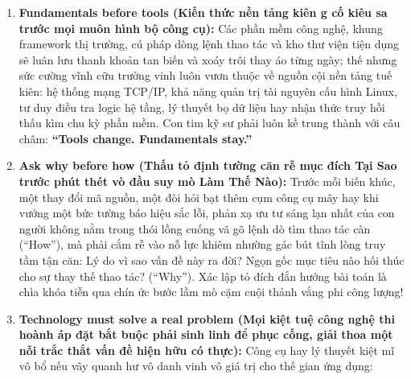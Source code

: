 \begin{enumerate}
\def\labelenumi{\arabic{enumi}.}
\tightlist
\item
  \textbf{Fundamentals before tools (Kiến thức nền tảng kiên g cố kiêu
  sa trước mọi muôn hình bộ công cụ):} Các phần mềm công nghệ, khung
  framework thị trường, cú pháp dòng lệnh thao tác và kho thư viện tiện
  dụng sẽ luân lưu thanh khoản tan biến và xoáy trôi thay áo từng ngày;
  thế nhưng sức cường vĩnh cữu trường vinh luôn vươn thuộc về nguồn cội
  nền tảng tuế kiên: hệ thống mạng TCP/IP, khả năng quản trị tài nguyên
  cấu hình Linux, tư duy điều tra logic hệ tầng, lý thuyết bọ dữ liệu
  hay nhận thức truy hồi thấu kìm chu kỳ phần mềm. Con tim kỹ sư phải
  luôn kề trung thành với câu châm: \textbf{``Tools change. Fundamentals
  stay.''}
\item
  \textbf{Ask why before how (Thấu tỏ định tường căn rễ mục đích Tại Sao
  trước phút thét vò đầu suy mò Làm Thế Nào):} Trước mỗi biến khúc, một
  thay đổi mã nguồn, một đòi hỏi bạt thêm cụm công cụ mây hay khi vướng
  một bức tường báo hiệu sắc lỗi, phản xạ ưu tư sáng lạn nhất của con
  người không nằm trong thói lồng cuống vã gõ lệnh dò tìm thao tác càn
  (``How''), mà phải cắm rễ vào nỗ lực khiêm nhường gác bút tĩnh lòng
  truy tầm tận căn: Lý do vì sao vấn đề này ra đời? Ngọn gốc mục tiêu
  nào hối thúc cho sự thay thế thao tác? (``Why''). Xác lập tỏ đích đắn
  hướng bài toán là chìa khóa tiễn qua chín ức bước lầm mò cặm cuội
  thảnh vắng phi công lượng!
\item
  \textbf{Technology must solve a real problem (Mọi kiệt tuệ công nghệ
  thi hoành áp đặt bắt buộc phải sinh linh để phục cống, giải thoa một
  nỗi trắc thắt vấn đề hiện hữu có thực):} Công cụ hay lý thuyết kiệt mĩ
  vô bổ nếu vây quanh hư vô danh vinh vô giá trị cho thế gian ứng dụng:


\end{enumerate}
